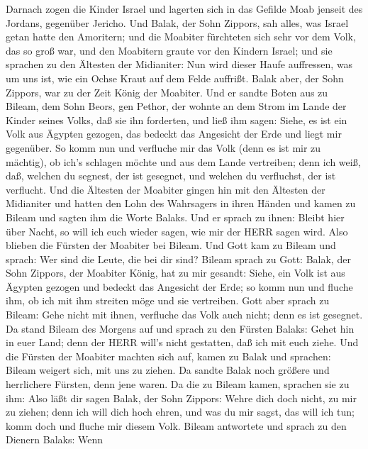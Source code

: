  Darnach zogen die Kinder Israel und lagerten sich in das
Gefilde Moab jenseit des Jordans, gegenüber Jericho.  Und
Balak, der Sohn Zippors, sah alles, was Israel getan hatte den
Amoritern;  und die Moabiter fürchteten sich sehr vor dem
Volk, das so groß war, und den Moabitern graute vor den Kindern Israel;
 und sie sprachen zu den Ältesten der Midianiter: Nun wird
dieser Haufe auffressen, was um uns ist, wie ein Ochse Kraut auf dem
Felde auffrißt. Balak aber, der Sohn Zippors, war zu der Zeit König der
Moabiter.  Und er sandte Boten aus zu Bileam, dem Sohn
Beors, gen Pethor, der wohnte an dem Strom im Lande der Kinder seines
Volks, daß sie ihn forderten, und ließ ihm sagen: Siehe, es ist ein Volk
aus Ägypten gezogen, das bedeckt das Angesicht der Erde und liegt mir
gegenüber.  So komm nun und verfluche mir das Volk (denn es
ist mir zu mächtig), ob ich's schlagen möchte und aus dem Lande
vertreiben; denn ich weiß, daß, welchen du segnest, der ist gesegnet,
und welchen du verfluchst, der ist verflucht.  Und die
Ältesten der Moabiter gingen hin mit den Ältesten der Midianiter und
hatten den Lohn des Wahrsagers in ihren Händen und kamen zu Bileam und
sagten ihm die Worte Balaks.  Und er sprach zu ihnen: Bleibt
hier über Nacht, so will ich euch wieder sagen, wie mir der HERR sagen
wird. Also blieben die Fürsten der Moabiter bei Bileam.  Und
Gott kam zu Bileam und sprach: Wer sind die Leute, die bei dir sind?
 Bileam sprach zu Gott: Balak, der Sohn Zippors, der
Moabiter König, hat zu mir gesandt:  Siehe, ein Volk ist
aus Ägypten gezogen und bedeckt das Angesicht der Erde; so komm nun und
fluche ihm, ob ich mit ihm streiten möge und sie vertreiben.
 Gott aber sprach zu Bileam: Gehe nicht mit ihnen,
verfluche das Volk auch nicht; denn es ist gesegnet.  Da
stand Bileam des Morgens auf und sprach zu den Fürsten Balaks: Gehet hin
in euer Land; denn der HERR will's nicht gestatten, daß ich mit euch
ziehe.  Und die Fürsten der Moabiter machten sich auf,
kamen zu Balak und sprachen: Bileam weigert sich, mit uns zu ziehen.
 Da sandte Balak noch größere und herrlichere Fürsten, denn
jene waren.  Da die zu Bileam kamen, sprachen sie zu ihm:
Also läßt dir sagen Balak, der Sohn Zippors: Wehre dich doch nicht, zu
mir zu ziehen;  denn ich will dich hoch ehren, und was du
mir sagst, das will ich tun; komm doch und fluche mir diesem Volk.
 Bileam antwortete und sprach zu den Dienern Balaks: Wenn
